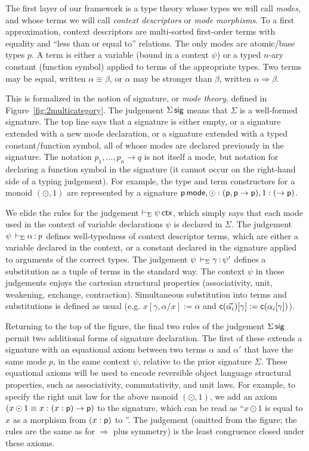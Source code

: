 \documentclass[a4paper,USenglish,numberwithinsect]{lipics-v2016}
\newcommand\deq{\ensuremath{\equiv}}
\newcommand\spr{\ensuremath{\Rightarrow}} %
\begin{document}
The first layer of our framework is a type theory whose types we will
call \emph{modes}, and whose terms we will call \emph{context
  descriptors} or \emph{mode morphisms}.  To a first approximation,
context descriptors are multi-sorted first-order terms with equality and
``less than or equal to'' relations.  The only modes are atomic/base
types $p$.  A term is either a variable (bound in a context $\psi$) or a
typed $n$-ary constant (function symbol)  applied to terms of the
appropriate types.  Two terms may be equal, written $\alpha \deq \beta$,
or $\alpha$ may be stronger than $\beta$, written $\alpha \spr \beta$.  

This is formalized in the notion of signature, or \emph{mode theory},
defined in Figure~\ref{fig:2multicategory}.  The judgement $\Sigma \, \mathsf{sig}$ means that $\Sigma$ is a well-formed signature.  The top line
says that a signature is either empty, or a signature extended with a
new mode declaration, or a signature extended with a typed
constant/function symbol, all of whose modes are declared previously in
the signature.  The notation $p_1,\ldots,p_n \to q$ is not itself a
mode, but notation for declaring a function symbol in the signature (it
cannot occur on the right-hand side of a typing judgement).  For
example, the type and term constructors for a monoid $(\odot,1)$ are
represented by a signature $\mathsf{p} \, \mathsf{mode}, \mathsf{\odot} :
(\mathsf{p},\mathsf{p} \to \mathsf{p}), 1 : (\to \mathsf{p})$.

We elide the rules for the judgement $\vdash_\Sigma \psi \, \mathsf{ctx}$, which
simply says that each mode used in the context of variable declarations
$\psi$ is declared in $\Sigma$.  The judgement
$\psi \,\vdash_{\Sigma} \mathit{\alpha} \, \mathit{:} \, \mathit{p}$ defines well-typedness of context
descriptor terms, which are either a variable declared in the context,
or a constant declared in the signature applied to arguments of the
correct types.  The judgement $\psi \,\vdash_{\Sigma} \mathit{\gamma} \, \mathit{:} \, \mathit{\psi'}$
defines a substitution as a tuple of terms in the standard way.  The
context $\psi$ in these judgements enjoys the cartesian structural
properties (associativity, unit, weakening, exchange, contraction).
Simultaneous substitution into terms and substitutions is defined as
usual (e.g.  $x[\gamma,\alpha/x] := \alpha$ and
$\mathsf{c}(\vec{\alpha_i})[\gamma] := \mathsf{c}(\alpha_i[\gamma])$).

Returning to the top of the figure, the final two rules of the judgement
$\Sigma \, \mathsf{sig}$ permit two additional forms of signature declaration.
The first of these extends a signature with an equational axiom between
two terms $\alpha$ and $\alpha'$ that have the same mode $p$, in the
same context $\psi$, relative to the prior signature $\Sigma$.  These
equational axioms will be used to encode reversible object language
structural properties, such as associativity, commutativity, and unit
laws.  For example, to specify the right unit law for the above monoid
$(\odot,1)$, we add an axiom $(x \odot 1 \deq x : (x : \dsd{p}) \to
\dsd{p})$ to the signature, which can be read as ``$x \odot 1$ is equal
to $x$ as a morphism from $(x : \mathsf{p})$ to ''.  The judgement
 (omitted from the figure; the
rules are the same as for $\spr$ plus symmetry) is the least congruence
closed under these axioms.
\end{document}
